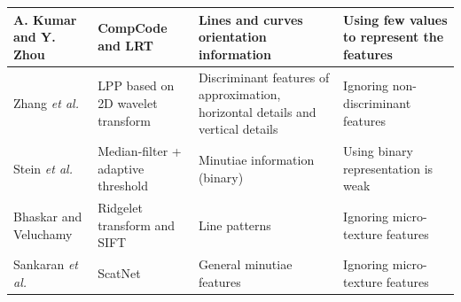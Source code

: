\documentclass[review]{elsarticle}
\begin{document}
\begin{table}[!p]
{\begin{tabular}{|C{3.5cm}|C{3cm}|C{4cm}|C{4.5cm}|}
			A. Kumar and Y. Zhou \cite{Kumar2012Human} 		& CompCode and LRT & Lines and curves orientation information & Using few values to represent the features \\ \hline
			Zhang \textit{et al.} \cite{zhang2012hand} 		& LPP based on 2D wavelet transform & Discriminant features of approximation, horizontal details and vertical details & Ignoring non-discriminant features\\ \hline
			Stein \textit{et al.} \cite{stein2013video} 		& Median-filter + adaptive threshold & Minutiae information (binary) & Using binary representation is weak\\ \hline
			Bhaskar and Veluchamy \cite{Bhaskar2014Hand} 		& Ridgelet transform and SIFT & Line patterns & Ignoring micro-texture features\\ \hline
			Sankaran \textit{et al.} \cite{sankaran2015Onsmartphone} 		& ScatNet & General minutiae features & Ignoring micro-texture features\\ \hline
		\end{tabular}}
\end{table}
\end{document}

